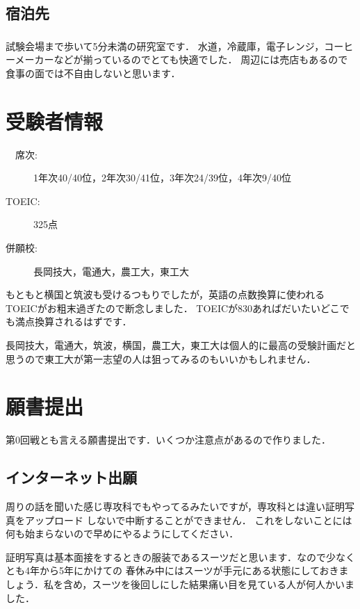 \documentclass[dvipdfmx]{jsarticle}
\begin{document}
\subsection{宿泊先}
\subsubsection*{}
試験会場まで歩いて5分未満の研究室です．
水道，冷蔵庫，電子レンジ，コーヒーメーカーなどが揃っているのでとても快適でした．
周辺には売店もあるので食事の面では不自由しないと思います．

\section{受験者情報}
\begin{description}
  \item[ 　席次:] 1年次40/40位，2年次30/41位，3年次24/39位，4年次9/40位
  \item[TOEIC:] 325点
  \item[ 併願校:] 長岡技大，電通大，農工大，東工大
\end{description}

もともと横国と筑波も受けるつもりでしたが，英語の点数換算に使われるTOEICがお粗末過ぎたので断念しました．
TOEICが830あればだいたいどこでも満点換算されるはずです．

長岡技大，電通大，筑波，横国，農工大，東工大は個人的に最高の受験計画だと思うので東工大が第一志望の人は狙ってみるのもいいかもしれません．

\section{願書提出}
第0回戦とも言える願書提出です．いくつか注意点があるので作りました．

\subsection{インターネット出願}
周りの話を聞いた感じ専攻科でもやってるみたいですが，専攻科とは違い証明写真をアップロード
しないで中断することができません．
これをしないことには何も始まらないので早めにやるようにしてください．

証明写真は基本面接をするときの服装であるスーツだと思います．なので少なくとも4年から5年にかけての
春休み中にはスーツが手元にある状態にしておきましょう．私を含め，スーツを後回しにした結果痛い目を見ている人が何人かいました．
\end{document}
